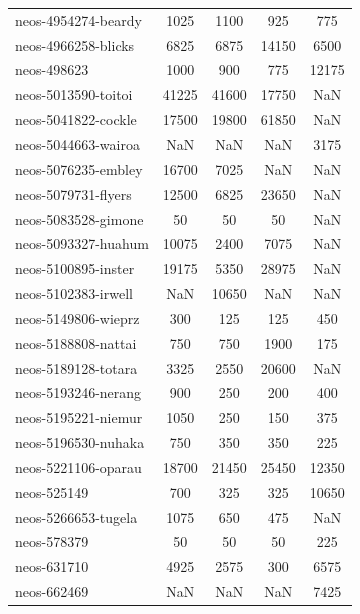 \begin{longtable}{lcccc}
neos-4954274-beardy         &     1025 &     1100 &      925 &   775 \\
neos-4966258-blicks         &     6825 &     6875 &    14150 &  6500 \\
neos-498623                 &     1000 &      900 &      775 & 12175 \\
neos-5013590-toitoi         &    41225 &    41600 &    17750 &   NaN \\
neos-5041822-cockle         &    17500 &    19800 &    61850 &   NaN \\
neos-5044663-wairoa         &      NaN &      NaN &      NaN &  3175 \\
neos-5076235-embley         &    16700 &     7025 &      NaN &   NaN \\
neos-5079731-flyers         &    12500 &     6825 &    23650 &   NaN \\
neos-5083528-gimone         &       50 &       50 &       50 &   NaN \\
neos-5093327-huahum         &    10075 &     2400 &     7075 &   NaN \\
neos-5100895-inster         &    19175 &     5350 &    28975 &   NaN \\
neos-5102383-irwell         &      NaN &    10650 &      NaN &   NaN \\
neos-5149806-wieprz         &      300 &      125 &      125 &   450 \\
neos-5188808-nattai         &      750 &      750 &     1900 &   175 \\
neos-5189128-totara         &     3325 &     2550 &    20600 &   NaN \\
neos-5193246-nerang         &      900 &      250 &      200 &   400 \\
neos-5195221-niemur         &     1050 &      250 &      150 &   375 \\
neos-5196530-nuhaka         &      750 &      350 &      350 &   225 \\
neos-5221106-oparau         &    18700 &    21450 &    25450 & 12350 \\
neos-525149                 &      700 &      325 &      325 & 10650 \\
neos-5266653-tugela         &     1075 &      650 &      475 &   NaN \\
neos-578379                 &       50 &       50 &       50 &   225 \\
neos-631710                 &     4925 &     2575 &      300 &  6575 \\
neos-662469                 &      NaN &      NaN &      NaN &  7425 \\

\end{longtable}
